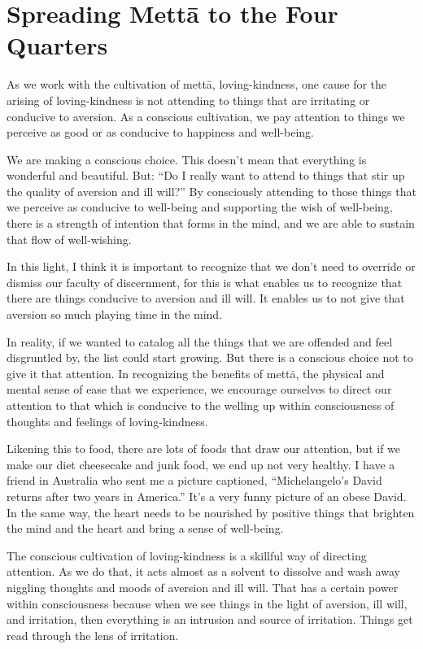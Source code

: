\chapter{Spreading Mettā to the Four
Quarters}

As we work with the cultivation of mettā, loving-kindness, one cause for
the arising of loving-kindness is not attending to things that are
irritating or conducive to aversion. As a conscious cultivation, we pay
attention to things we perceive as good or as conducive to happiness and
well-being.

We are making a conscious choice. This doesn’t mean that everything is
wonderful and beautiful. But: “Do I really want to attend to things that
stir up the quality of aversion and ill will?” By consciously attending
to those things that we perceive as conducive to well-being and
supporting the wish of well-being, there is a strength of intention that
forms in the mind, and we are able to sustain that flow of well-wishing.

In this light, I think it is important to recognize that we don’t need
to override or dismiss our faculty of discernment, for this is what
enables us to recognize that there are things conducive to aversion and
ill will. It enables us to not give that aversion so much playing time
in the mind.

In reality, if we wanted to catalog all the things that we are offended
and feel disgruntled by, the list could start growing. But there is a
conscious choice not to give it that attention. In recognizing the
benefits of mettā, the physical and mental sense of ease that we
experience, we encourage ourselves to direct our attention to that which
is conducive to the welling up within consciousness of thoughts and
feelings of loving-kindness.

Likening this to food, there are lots of foods that draw our attention,
but if we make our diet cheesecake and junk food, we end up not very
healthy. I have a friend in Australia who sent me a picture captioned,
“Michelangelo’s David returns after two years in America.” It’s a very
funny picture of an obese David. In the same way, the heart needs to be
nourished by positive things that brighten the mind and the heart and
bring a sense of well-being.

The conscious cultivation of loving-kindness is a skillful way of
directing attention. As we do that, it acts almost as a solvent to
dissolve and wash away niggling thoughts and moods of aversion and ill
will. That has a certain power within consciousness because when we see
things in the light of aversion, ill will, and irritation, then
everything is an intrusion and source of irritation. Things get read
through the lens of irritation.

